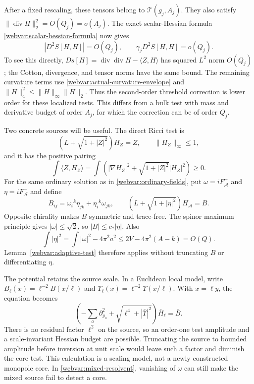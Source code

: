 After a fixed rescaling, these tensors belong to
$\mathcal T(g_j,A_j)$.  They also satisfy
$\|\operatorname{div}H\|_2^2=O(Q_j)=o(A_j)$.
The exact scalar-Hessian formula
\eqref{webvar:scalar-hessian-formula} now gives
\begin{equation}\label{webvar:adaptive-scalar-correction}
 |D^2S[H,H]|=O(Q_j),\qquad \gamma_jD^2S[H,H]=o(Q_j).
\end{equation}
To see this directly, $Ds[H]=\operatorname{div}\operatorname{div}H-
\langle Z,H\rangle$ has squared $L^2$ norm $O(Q_j)$; the Cotton,
divergence, and tensor norms have the same bound.  The remaining
curvature terms use \eqref{webvar:actual-curvature-envelope} and
$\|H\|_4^2\le\|H\|_\infty\|H\|_2$.
Thus the second-order threshold correction is lower order for these
localized tests.  This differs from a bulk test with mass and
derivative budget of order $A_j$, for which the correction can be
of order $Q_j$.

Two concrete sources will be useful.  The direct Ricci test is
\begin{equation}\label{webvar:direct-resolvent}
 (L+\sqrt{1+|Z|^2})H_Z=Z,\qquad \|H_Z\|_\infty\le1,
\end{equation}
and it has the positive pairing
\begin{equation}\label{webvar:direct-pairing}
 \int\langle Z,H_Z\rangle
  =\int(|\nabla H_Z|^2+\sqrt{1+|Z|^2}|H_Z|^2)\ge0.
\end{equation}
For the same ordinary solution as in
\eqref{webvar:ordinary-fields}, put
$\omega=iF_{\mathcal A}^+$ and $\eta=iF_{\mathcal A}^-$ and define
\begin{equation}\label{webvar:mixed-resolvent}
 B_{ij}=\omega_i{}^k\eta_{jk}+\eta_i{}^k\omega_{jk},\qquad
 (L+\sqrt{1+|\eta|^2})H_{\mathcal A}=B.
\end{equation}
Opposite chirality makes $B$ symmetric and trace-free.
The spinor maximum principle gives $|\omega|\le\sqrt2$, so
$|B|\le c_*|\eta|$.  Also
\[
 \int|\eta|^2=\int|\omega|^2-4\pi^2a^2
 \le2V-4\pi^2(A-k)=O(Q).
\]
Lemma~\ref{webvar:adaptive-test} therefore applies without truncating
$B$ or differentiating $\eta$.

The potential retains the source scale.  In a Euclidean local model,
write $B_\ell(x)=\ell^{-2}\overline B(x/\ell)$ and
$\Upsilon_\ell(x)=\ell^{-2}\overline\Upsilon(x/\ell)$.
With $x=\ell y$, the equation becomes
\[
 \left(-\sum_a\partial_{y_a}^2+
       \sqrt{\ell^4+|\overline\Upsilon|^2}\right)\overline H_\ell
       =\overline B.
\]
There is no residual factor $\ell^2$ on the source, so an order-one
test amplitude and a scale-invariant Hessian budget are possible.
Truncating the source to bounded amplitude before inversion at unit
scale would leave such a factor and diminish the core test.
This calculation is a scaling model, not a newly constructed monopole
core.  In \eqref{webvar:mixed-resolvent}, vanishing of $\omega$ can
still make the mixed source fail to detect a core.

